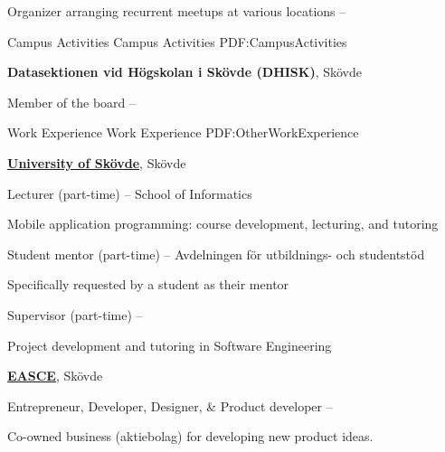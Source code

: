 \documentclass[letterpaper,MMMyyyy,nonstopmode]{simpleresumecv}
\begin{document}
\begin{Body}
\Gap
\BulletItem
Organizer arranging recurrent meetups at various locations
\hfill
{} -- 


\Section
{Campus Activities}
{Campus Activities}
{PDF:CampusActivities}

\Entry
\textbf{Datasektionen vid Högskolan i Skövde (DHISK)}, Skövde

\Gap
\BulletItem
Member of the board
\hfill
{} -- 


\Section
{Work Experience}
{Work Experience}
{PDF:OtherWorkExperience}

\Entry
\href{http://his.se}
{\textbf{University of Skövde}}, Skövde

\Gap
\BulletItem
Lecturer (part-time)
\hfill
{} --
\newline
School of Informatics
\begin{Detail}
\SubBulletItem
Mobile application programming: course development, lecturing, and tutoring
\end{Detail}

\Gap
\BulletItem
Student mentor (part-time)
\hfill
{} --
\newline
Avdelningen för utbildnings- och studentstöd
\begin{Detail}
\SubBulletItem
Specifically requested by a student as their mentor
\end{Detail}

\Gap
\BulletItem
Supervisor (part-time)
\hfill
{} --
\begin{Detail}
\SubBulletItem
Project development and tutoring in Software Engineering
\end{Detail}

\BigGap
\Entry
\href{http://easce.com/}
{\textbf{EASCE}}, Skövde

\Gap
\BulletItem
Entrepreneur, Developer, Designer, \& Product developer
\hfill
{} --
\begin{Detail}
\SubBulletItem
Co-owned business (aktiebolag) for developing new product ideas. 
\end{Detail}


\end{Body}
\end{document}
